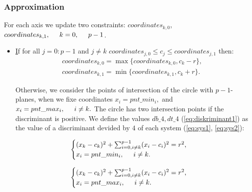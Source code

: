 \documentclass{report}
\begin{document}
\subsubsection*{Approximation}

For each axis we update two constraints: $coordinates_{k,0}$, $ coordinates_{k,1}, \hspace*{5mm} k = 0,\hspace*{5mm}  p-1 $.
\begin{itemize}
	
	\item \underline 
	
	If for  all $j = 0: p-1$  and $j \neq k$ $coordinates_{j,0} \le c_j\le coordinates_{j,1} $ then: 
	\begin{equation}
		\begin{gathered}
			coordinates_{k,0} = \max\{coordinates_{k,0}, c_k - r\},\\
			coordinates_{k,1} = \min\{coordinates_{k,1}, c_k + r\}.
		\end{gathered}
	\end{equation}
	
	Otherwise, we consider the points of intersection of the circle with $p-1$-planes, when we fixe coordinates   $x_i = pnt\_min_i,$ and $x_i = pnt\_max_i, \hspace*{5mm} i \neq k.$  The circle has two intersection points  if the discriminant is positive. We define the values $db\_4, dt\_4$ (\ref{eq:diskriminant1}) as the value of a discriminant devided by  $4$ of each system (\ref{eq:sys1}, \ref{eq:sys2}):
	
	\begin{equation}
		\begin{cases}
			(x_k - c_k)^2 + \sum_{i=0, i \neq k}^{p-1} (x_i - c_i)^2 = r^2,\\ 
			x_i = pnt\_min_i,\hspace*{5mm} i \neq k.
		\end{cases}
		\label{eq:sys1}
	\end{equation}
	
	\begin{equation}
		\begin{cases}
			(x_k - c_k)^2 + \sum_{i=0, i \neq k}^{p-1} (x_i - c_i)^2 = r^2,\\ 
			x_i = pnt\_max_i,\hspace*{5mm} i \neq k.
		\end{cases}
		\label{eq:sys2}
	\end{equation}
	

\end{itemize}
\end{document}
